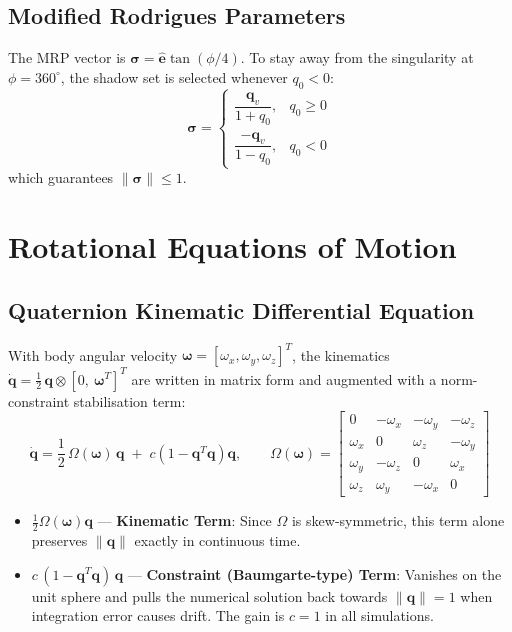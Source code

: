 \documentclass[11pt, a4paper]{article}
\newcommand{\vect}[1]{\boldsymbol{#1}}
\newcommand{\qv}{\vect{q}_v}
\newcommand{\w}{\vect{\omega}}
\begin{document}
\subsection{Modified Rodrigues Parameters}
The MRP vector is $\vect{\sigma} = \hat{\vect{e}} \tan(\phi/4)$. To stay away from the singularity at $\phi = 360^\circ$, the shadow set is selected whenever $q_0 < 0$:
\begin{equation}
\vect{\sigma} =
\begin{cases}
\dfrac{\qv}{1 + q_0}, & q_0 \ge 0 \\[2ex]
\dfrac{-\qv}{1 - q_0}, & q_0 < 0
\end{cases}
\end{equation}
which guarantees $\lVert \vect{\sigma} \rVert \le 1$.

\section{Rotational Equations of Motion}

\subsection{Quaternion Kinematic Differential Equation}
With body angular velocity $\w = [\omega_x, \omega_y, \omega_z]^T$, the kinematics $\dot{\vect{q}} = \tfrac{1}{2}\, \vect{q} \otimes [0,\ \w^T]^T$ are written in matrix form and augmented with a norm-constraint stabilisation term:
\begin{equation}
\dot{\vect{q}} = \frac{1}{2}\, \Omega(\w)\, \vect{q} \;+\; c \left( 1 - \vect{q}^T \vect{q} \right) \vect{q},
\qquad
\Omega(\w) =
\begin{bmatrix}
0 & -\omega_x & -\omega_y & -\omega_z \\
\omega_x & 0 & \omega_z & -\omega_y \\
\omega_y & -\omega_z & 0 & \omega_x \\
\omega_z & \omega_y & -\omega_x & 0
\end{bmatrix}
\end{equation}

\begin{itemize}
    \item $\tfrac{1}{2}\Omega(\w)\vect{q}$ --- \textbf{Kinematic Term}: Since $\Omega$ is skew-symmetric, this term alone preserves $\lVert \vect{q} \rVert$ exactly in continuous time.
    \item $c\,(1 - \vect{q}^T\vect{q})\,\vect{q}$ --- \textbf{Constraint (Baumgarte-type) Term}: Vanishes on the unit sphere and pulls the numerical solution back towards $\lVert \vect{q} \rVert = 1$ when integration error causes drift. The gain is $c = 1$ in all simulations.
\end{itemize}
\end{document}
